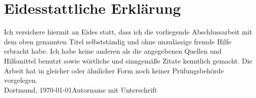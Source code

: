 \newpage
\thispagestyle{empty}
\section*{Eidesstattliche Erklärung}
\thispagestyle{empty}
Ich versichere hiermit an Eides statt, dass ich die vorliegende Abschlussarbeit mit dem oben genannten Titel selbstständig und ohne unzulässige fremde Hilfe erbracht habe. Ich habe keine anderen als die angegebenen Quellen und Hilfsmittel benutzt sowie wörtliche und sinngemäße Zitate kenntlich gemacht. Die Arbeit hat in gleicher oder ähnlicher Form noch keiner Prüfungsbehörde vorgelegen.
\vspace{4\baselineskip}\\
Dortmund, \today \hfill Autorname mit Unterschrift
\vspace{4\baselineskip}\\